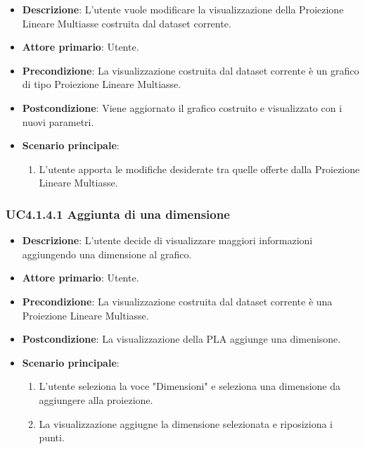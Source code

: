 \begin{itemize}
    \item \textbf{Descrizione}: L’utente vuole modificare la visualizzazione della Proiezione Lineare Multiasse
                                costruita dal dataset corrente.
	
    \item \textbf{Attore primario}: Utente.
    
    \item \textbf{Precondizione}:   La visualizzazione costruita dal dataset corrente è un grafico di tipo Proiezione Lineare Multiasse.
    \item \textbf{Postcondizione}:  Viene aggiornato il grafico costruito e visualizzato con i nuovi parametri.

	\item \textbf{Scenario principale}:
		\begin{enumerate}
            \item L'utente apporta le modifiche desiderate tra quelle offerte dalla Proiezione Lineare Multiasse.
        \end{enumerate}
\end{itemize}

\subsubsection{UC4.1.4.1 Aggiunta di una dimensione}
\label{subsec:uc4.1.4.1}
\begin{itemize}
    \item \textbf{Descrizione}: L’utente decide di visualizzare maggiori informazioni
                                aggiungendo una dimensione al grafico.

    \item \textbf{Attore primario}: Utente.
    
    \item \textbf{Precondizione}:   La visualizzazione costruita dal dataset corrente è una Proiezione Lineare Multiasse.
    \item \textbf{Postcondizione}:  La visualizzazione della PLA aggiunge una dimenisone.

	\item \textbf{Scenario principale}:
        \begin{enumerate}
            \item L'utente seleziona la voce "Dimensioni" e seleziona una dimensione da aggiungere alla proiezione.
            \item La visualizzazione aggiugne la dimensione selezionata e riposiziona i punti.
           
        \end{enumerate}
\end{itemize}

